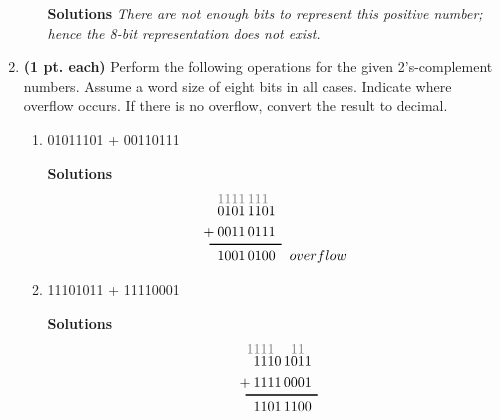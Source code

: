 \begin{enumerate}
\begin{enumerate}
                    \begin{onlysolution} \textbf{Solutions} \itshape{
                            There are not enough bits to represent this positive number; hence
                            the 8-bit representation does not exist.
                        }
                    \end{onlysolution}

            \end{enumerate}
            \filbreak
        \item \textbf{ (1 pt. each)} Perform the following operations for the given
            2's-complement numbers. Assume a word size of eight bits
            in all cases. Indicate where overflow occurs. If there is no overflow,
            convert the result to decimal.
            \begin{enumerate}

                \item 01011101 + 00110111

                    \begin{onlysolution} \textbf{Solutions}
                        \begin{align*}
                            {\color{gray}
                            1111\,111\0 }&\\[-1.5ex]
                            0101\,1101&\\
                            +\:0011\,0111&\\[-2ex]
                            \rule{12ex}{1pt}\hspace{-1ex}&\\[-1ex]
                            1001\,0100&\quad  overflow
                        \end{align*}
                    \end{onlysolution}

                \item 11101011 + 11110001

                    \begin{onlysolution} \textbf{Solutions}
                        \begin{align*}
                            {\color{gray}
                            1111\0\911\0 }&\\[-1.5ex]
                            1110\,1011&\\
                            +\:1111\,0001&\\[-2ex]
                            \rule{12ex}{1pt}\hspace{-1ex}&\\[-1ex]
                            1101\,1100&
                        \end{align*}
                    \end{onlysolution}


\end{enumerate}
\end{enumerate}
